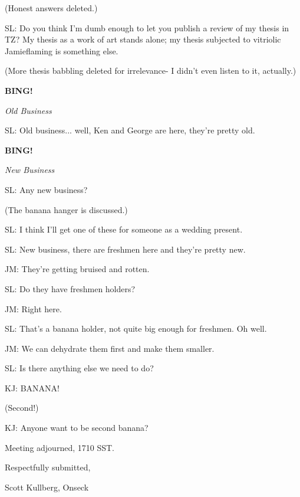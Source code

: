 \documentclass[12pt]{article}
\newcommand{\bing}{{\bf BING!} }
\newcommand{\goto}[1]{\bing \vskip 12pt \centerline{{\em{#1}}}}
\begin{document}
(Honest answers deleted.)

SL: Do you think I'm dumb enough to let you publish a review of my thesis in TZ? My thesis as a work of art stands alone; my thesis subjected to vitriolic Jamieflaming is something else.

(More thesis babbling deleted for irrelevance- I didn't even listen to it, actually.)

\goto{Old Business}

SL: Old business... well, Ken and George are here, they're pretty old.

\goto{New Business}

SL: Any new business?

(The banana hanger is discussed.)

SL: I think I'll get one of these for someone as a wedding present.

SL: New business, there are freshmen here and they're pretty new.

JM: They're getting bruised and rotten.

SL: Do they have freshmen holders?

JM: Right here.

SL: That's a banana holder, not quite big enough for freshmen. Oh well.

JM: We can dehydrate them first and make them smaller.

SL: Is there anything else we need to do?

KJ: BANANA!

(Second!)

KJ: Anyone want to be second banana?

\vspace{12pt}

\noindent
Meeting adjourned, 1710 SST.

\vspace{18pt}

\centerline{Respectfully submitted,}
\centerline{Scott Kullberg, Onseck}
\end{document}
